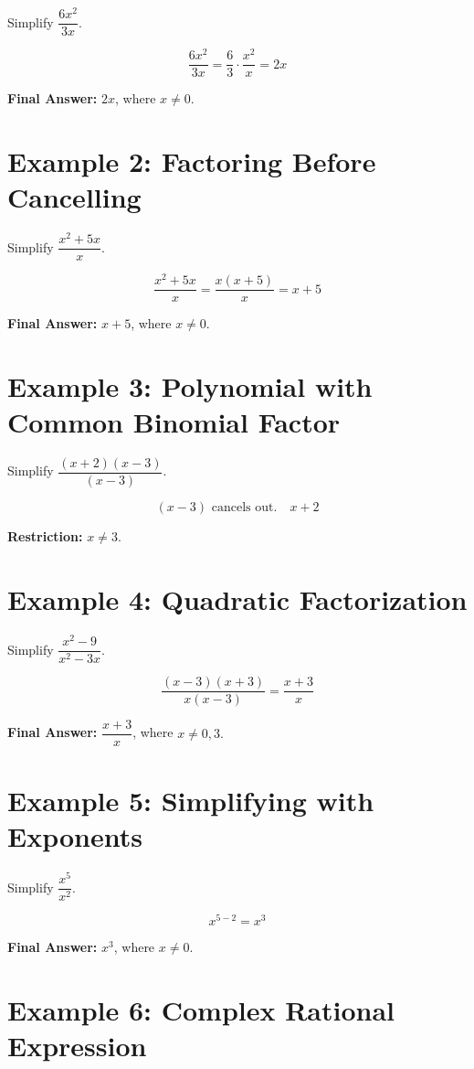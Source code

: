 \documentclass[14pt]{extarticle}
\begin{document}
Simplify \(\dfrac{6x^2}{3x}\).

\[
\dfrac{6x^2}{3x} = \dfrac{6}{3} \cdot \dfrac{x^2}{x} = 2x
\]

\textbf{Final Answer:} \(\boxed{2x}\), where \(x \ne 0.\)

\section*{Example 2: Factoring Before Cancelling}

Simplify \(\dfrac{x^2 + 5x}{x}\).

\[
\dfrac{x^2 + 5x}{x} = \dfrac{x(x + 5)}{x} = x + 5
\]

\textbf{Final Answer:} \(\boxed{x + 5}\), where \(x \ne 0.\)

\section*{Example 3: Polynomial with Common Binomial Factor}

Simplify \(\dfrac{(x + 2)(x - 3)}{(x - 3)}\).

\[
(x - 3)\text{ cancels out.} \quad \boxed{x + 2}
\]

\textbf{Restriction:} \(x \ne 3.\)

\section*{Example 4: Quadratic Factorization}

Simplify \(\dfrac{x^2 - 9}{x^2 - 3x}\).

\[
\dfrac{(x - 3)(x + 3)}{x(x - 3)} = \dfrac{x + 3}{x}
\]

\textbf{Final Answer:} \(\boxed{\dfrac{x + 3}{x}}\), where \(x \ne 0, 3.\)

\section*{Example 5: Simplifying with Exponents}

Simplify \(\dfrac{x^5}{x^2}\).

\[
x^{5 - 2} = x^3
\]

\textbf{Final Answer:} \(\boxed{x^3}\), where \(x \ne 0.\)

\section*{Example 6: Complex Rational Expression}
\end{document}
